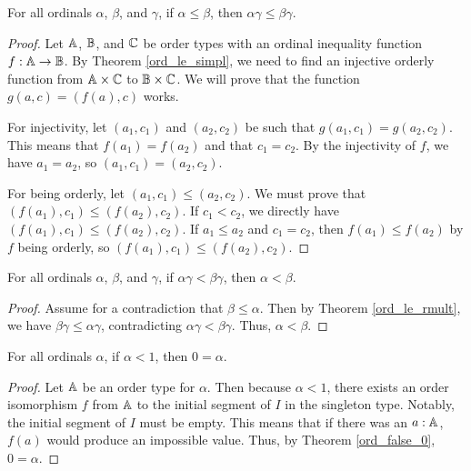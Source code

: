 \documentclass[../../math.tex]{subfiles}
\begin{document}
\begin{theorem} \label{ord_le_rmult}
    For all ordinals $\alpha$, $\beta$, and $\gamma$, if $\alpha \leq \beta$,
    then $\alpha \gamma \leq \beta \gamma$.
\end{theorem}
\begin{proof}
    Let $\mathbb{A}$, $\mathbb{B}$, and $\mathbb{C}$ be order types with an ordinal inequality function
    $f : \mathbb{A} \to \mathbb{B}$.  By Theorem \ref{ord_le_simpl}, we need to find an
    injective orderly function from $\mathbb{A} \times \mathbb{C}$ to $\mathbb{B} \times \mathbb{C}$.
    We will prove that the function $g(a, c) = (f(a), c)$ works.

    For injectivity, let $(a_1, c_1)$ and $(a_2, c_2)$ be such that $g(a_1, c_1)
    = g(a_2, c_2)$.  This means that $f(a_1) = f(a_2)$ and that $c_1 = c_2$.  By
    the injectivity of $f$, we have $a_1 = a_2$, so $(a_1, c_1) = (a_2, c_2)$.

    For being orderly, let $(a_1, c_1) \leq (a_2, c_2)$.  We must prove that
    $(f(a_1), c_1) \leq (f(a_2), c_2)$.  If $c_1 < c_2$, we directly have
    $(f(a_1), c_1) \leq (f(a_2), c_2)$.  If $a_1 \leq a_2$ and $c_1 = c_2$, then
    $f(a_1) \leq f(a_2)$ by $f$ being orderly, so $(f(a_1), c_1) \leq (f(a_2),
    c_2)$.
\end{proof}

\begin{theorem} \label{ord_lt_mult_rcancel}
    For all ordinals $\alpha$, $\beta$, and $\gamma$, if $\alpha \gamma < \beta
    \gamma$, then $\alpha < \beta$.
\end{theorem}
\begin{proof}
    Assume for a contradiction that $\beta \leq \alpha$.  Then by Theorem
    \ref{ord_le_rmult}, we have $\beta \gamma \leq \alpha \gamma$, contradicting
    $\alpha \gamma < \beta \gamma$.  Thus, $\alpha < \beta$.
\end{proof}

\begin{theorem} \label{ord_lt_one}
    For all ordinals $\alpha$, if $\alpha < 1$, then $0 = \alpha$.
\end{theorem}
\begin{proof}
    Let $\mathbb{A}$ be an order type for $\alpha$.  Then because $\alpha < 1$, there
    exists an order isomorphism $f$ from $\mathbb{A}$ to the initial segment of $I$ in
    the singleton type.  Notably, the initial segment of $I$ must be empty.
    This means that if there was an $a : \mathbb{A}$, $f(a)$ would produce an impossible
    value.  Thus, by Theorem \ref{ord_false_0}, $0 = \alpha$.
\end{proof}
\end{document}
